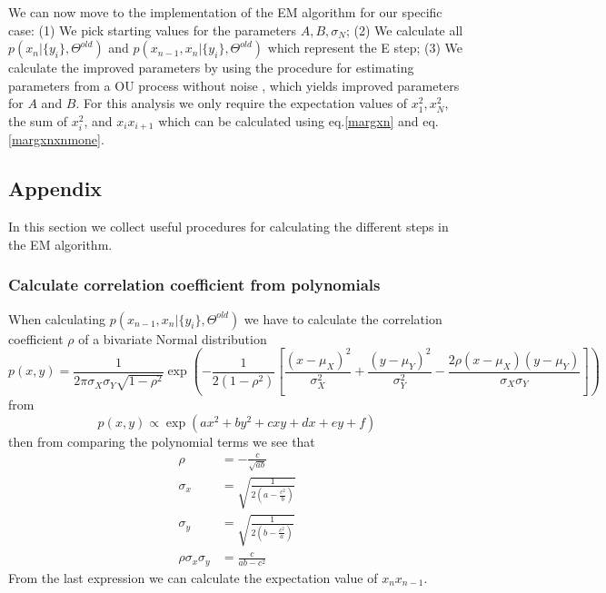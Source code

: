 \documentclass[%
 reprint,
 amsmath,amssymb,
 aps,
]{revtex4-1}
\begin{document}
We can now move to the implementation of the EM algorithm for our specific case: (1) We pick starting values for the parameters ${A,B,\sigma_N}$; (2) We calculate all $p\left( x_{n}|\{y_{i}\},\Theta^{old}\right)$ and $p\left( x_{n-1},x_{n}|\{y_{i}\},\Theta^{old}\right)$ which represent the E step; (3) We calculate the improved parameters by using the procedure for estimating parameters from a OU process without noise \cite{PRE}, which yields improved parameters for $A$ and $B$.  For this analysis we only require the expectation values of $x_{1}^{2},x_{N}^2$, the sum of $x_{i}^2$, and $x_{i}x_{i+1}$ which can be calculated using eq.\ref{margxn} and eq.\ref{margxnxnmone}.
\subsection{Appendix}
In this section we collect useful procedures for calculating the different steps in the EM algorithm.
\subsubsection{Calculate correlation coefficient from polynomials}
When calculating $p\left( x_{n-1},x_{n}|\{y_{i}\},\Theta^{old}\right)$ we have to calculate the correlation coefficient $\rho$ of a bivariate Normal distribution
\begin{equation}
    p(x,y) =
      \frac{1}{2 \pi  \sigma_X \sigma_Y \sqrt{1-\rho^2}}
      \exp\left(
        -\frac{1}{2(1-\rho^2)}\left[
          \frac{(x-\mu_X)^2}{\sigma_X^2} +
          \frac{(y-\mu_Y)^2}{\sigma_Y^2} -
          \frac{2\rho(x-\mu_X)(y-\mu_Y)}{\sigma_X \sigma_Y}
      \right]\right)
\end{equation}
from
\begin{equation}
	p(x,y) \propto \exp\left(ax^{2}+by^{2}+cxy+dx+ey+f\right)
\end{equation}
then from comparing the polynomial terms we see that
\begin{equation}
	\begin{aligned}
	\rho &= -\frac{c}{\sqrt{ab}}\\
	\sigma_{x} &=\sqrt{\frac{1}{2\left(a-\frac{c^2}{b}\right)}}\\
	\sigma_{y} &=\sqrt{\frac{1}{2\left(b-\frac{c^2}{a}\right)}}\\
	\rho \sigma_{x} \sigma_{y} &= \frac{c}{ab-c^2}
	\end{aligned}
\end{equation}
From the last expression we can calculate the expectation value of $x_{n}x_{n-1}$.
\end{document}
